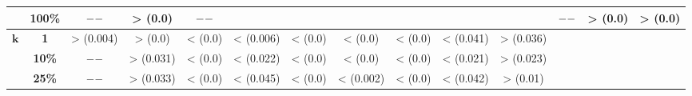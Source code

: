 \begin{table}[htbp]
{{\begin{tabular}{cccccccccccccc}
			& \textbf{100\%} & $\---$ & > (0.0) & $\---$ &       &       &       &       &       &       & $\---$ & > (0.0) & > (0.0) \\
	  \midrule
	  \multirow{3}[2]{*}{$\bm{k}$} & \textbf{1} & > (0.004) & > (0.0) & < (0.0) & < (0.006) & < (0.0) & < (0.0) & < (0.0) & < (0.041) & > (0.036) &       &       &  \\
			& \textbf{10\%} & $\---$ & > (0.031) & < (0.0) & < (0.022) & < (0.0) & < (0.0) & < (0.0) & < (0.021) & > (0.023) &       &       &  \\
			& \textbf{25\%} & $\---$ & > (0.033) & < (0.0) & < (0.045) & < (0.0) & < (0.002) & < (0.0) & < (0.042) & > (0.01) &       &       &  \\
	  \bottomrule
	  \end{tabular}}}%
\end{table}%
